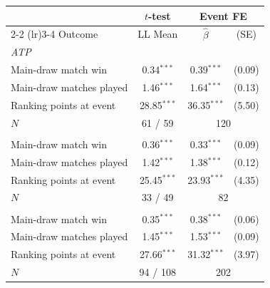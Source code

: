 \begin{tabular}{l ccc}
\toprule
 & $t$-test & \multicolumn{2}{c}{Event FE} \\
\cmidrule(lr){2-2} \cmidrule(lr){3-4}
Outcome & LL Mean & $\hat{\beta}$ & (SE) \\
\midrule
\multicolumn{4}{l}{\textit{ATP}} \\
\quad Main-draw match win & 0.34$^{***}$ & 0.39$^{***}$ & (0.09) \\
\quad Main-draw matches played & 1.46$^{***}$ & 1.64$^{***}$ & (0.13) \\
\quad Ranking points at event & 28.85$^{***}$ & 36.35$^{***}$ & (5.50) \\
\quad $N$ & \multicolumn{1}{c}{61 / 59} & \multicolumn{2}{c}{120} \\
\addlinespace
\multicolumn{4}{l}{\textit{WTA}} \\
\quad Main-draw match win & 0.36$^{***}$ & 0.33$^{***}$ & (0.09) \\
\quad Main-draw matches played & 1.42$^{***}$ & 1.38$^{***}$ & (0.12) \\
\quad Ranking points at event & 25.45$^{***}$ & 23.93$^{***}$ & (4.35) \\
\quad $N$ & \multicolumn{1}{c}{33 / 49} & \multicolumn{2}{c}{82} \\
\addlinespace
\multicolumn{4}{l}{\textit{Pooled}} \\
\quad Main-draw match win & 0.35$^{***}$ & 0.38$^{***}$ & (0.06) \\
\quad Main-draw matches played & 1.45$^{***}$ & 1.53$^{***}$ & (0.09) \\
\quad Ranking points at event & 27.66$^{***}$ & 31.32$^{***}$ & (3.97) \\
\quad $N$ & \multicolumn{1}{c}{94 / 108} & \multicolumn{2}{c}{202} \\
\bottomrule
\end{tabular}
